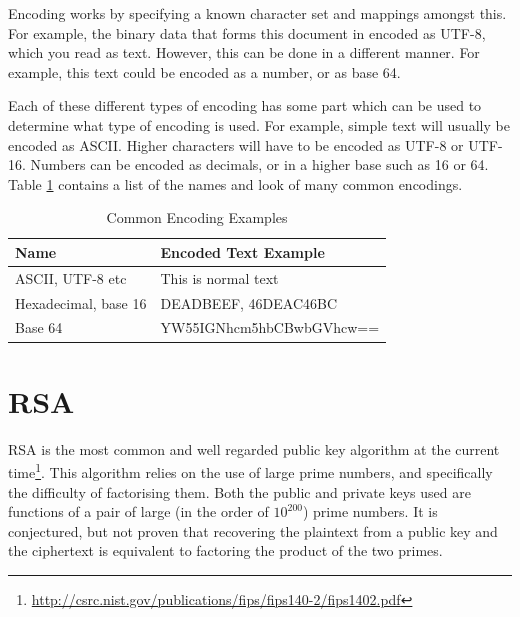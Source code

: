 				Encoding works by specifying a known character set and mappings amongst this.
				For example, the binary data that forms this document in encoded as UTF-8, which you read as text.
				However, this can be done in a different manner.
				For example, this text could be encoded as a number, or as base 64.

				Each of these different types of encoding has some part which can be used to determine what type of encoding is used.
				For example, simple text will usually be encoded as ASCII.
				Higher characters will have to be encoded as UTF-8 or UTF-16.
				Numbers can be encoded as decimals, or in a higher base such as 16 or 64.
				Table \ref{tab:Encodings} contains a list of the names and look of many common encodings.
				\begin{table}[htb]
					\centering
				\begin{adjustbox}{max width=1\textwidth}
					\begin{tabular}{ll}
						\toprule
						\textbf{Name} & \textbf{Encoded Text Example} \\
						\toprule
						ASCII, UTF-8 etc & This is normal text \\
						Hexadecimal, base 16 & DEADBEEF, 46DEAC46BC \\
						Base 64 & YW55IGNhcm5hbCBwbGVhcw== \\
						\bottomrule
					\end{tabular}
				\end{adjustbox}
					\caption{Common Encoding Examples}
					\label{tab:Encodings}
				\end{table}
	\section{RSA}
		RSA is the most common and well regarded public key algorithm at the current time\footnote{\url{http://csrc.nist.gov/publications/fips/fips140-2/fips1402.pdf}}.
		This algorithm relies on the use of large prime numbers, and specifically the difficulty of factorising them.
		Both the public and private keys used are functions of a pair of large (in the order of $10^{200}$) prime numbers.
		It is conjectured, but not proven that recovering the plaintext from a public key and the ciphertext is equivalent to factoring the product of the two primes.

